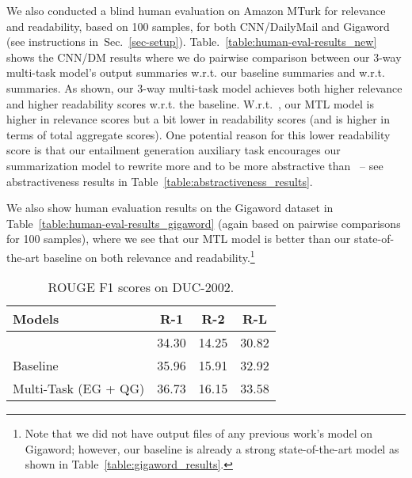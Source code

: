 \documentclass[11pt,a4paper]{article}
\def\secref#1{Sec.~\ref{#1}}
\begin{document}
We also conducted a blind human evaluation on Amazon MTurk for relevance and readability, based on 100 samples, for both CNN/DailyMail and Gigaword (see instructions in~\secref{sec-setup}). Table.~\ref{table:human-eval-results_new} shows the CNN/DM results where we do pairwise comparison between our 3-way multi-task model's output summaries w.r.t. our baseline summaries and w.r.t.~ summaries. As shown, our 3-way multi-task model achieves both higher relevance and higher readability scores w.r.t. the baseline. W.r.t.~, our MTL model is higher in relevance scores but a bit lower in readability scores (and is higher in terms of total aggregate scores). One potential reason for this lower readability score is that our entailment generation auxiliary task encourages our summarization model to rewrite more and to be more abstractive than~ -- see abstractiveness results in Table~\ref{table:abstractiveness_results}. 

We also show human evaluation results on the Gigaword dataset in Table~\ref{table:human-eval-results_gigaword} (again based on pairwise comparisons for 100 samples), where we see that our MTL model is better than our state-of-the-art baseline on both relevance and readability.\footnote{Note that we did not have output files of any previous work's model on Gigaword; however, our baseline is already a strong state-of-the-art model as shown in Table~\ref{table:gigaword_results}.}


\begin{table}[t]
\begin{small}
\begin{center}
\begin{tabular}{|l|c|c|c|}
\hline
Models & R-1 & R-2 & R-L \\
\hline
\citet{see2017get} & 34.30 & 14.25 & 30.82 \\
Baseline & 35.96 & 15.91 & 32.92 \\
Multi-Task (EG + QG) & 36.73 & 16.15 & 33.58  \\
\hline
\end{tabular}
\end{center}
\vspace{-10pt}
\caption{
ROUGE F1 scores on DUC-2002. \vspace{-10pt}}
\label{table:duc2002}
\vspace{-7pt}
\end{small}
\end{table}
\end{document}

